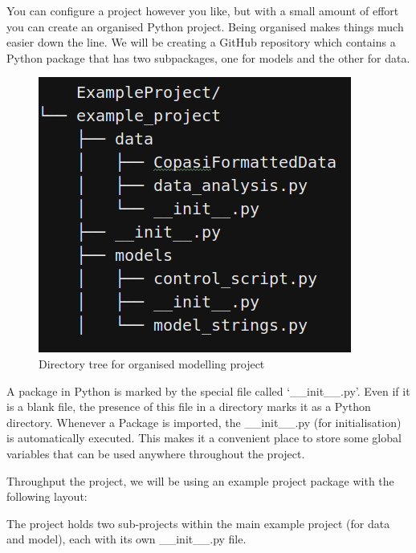 \documentclass[../main]{subfiles}
\begin{document}
You can configure a project however you like, but with a small amount of effort you can create an
organised Python project. Being organised makes things much easier down the line. We will be creating a
GitHub repository which contains a Python package that has two subpackages, one for models and the other
for data.
\begin{figure}[h]
\centering
\includegraphics[width=0.4\linewidth]{EnvConfig/assets/example_project_config}
\caption{Directory tree for organised modelling project}
\label{fig:config:example_project}
\end{figure}

A package in Python is marked by the special file called `\_\_init\_\_.py'. Even if it is a blank file,
the presence of this file in a directory marks it as a Python directory. Whenever a Package is imported, the
\_\_init\_\_.py (for initialisation) is automatically executed. This makes it a convenient place to store
some global variables that can be used anywhere throughout the project.

Throughput the project, we will be using an example project package with the following layout:

The project holds two sub-projects within the main example project (for data and model), each with its own \_\_init\_\_.py file.
\end{document}
